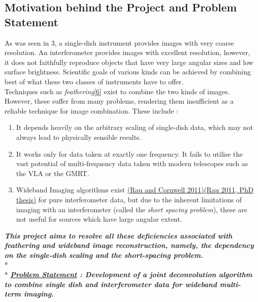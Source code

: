 \documentclass{article}
\begin{document}
\subsection{Motivation behind the Project and Problem Statement}
As was seen in \figurename{ 3}, a single-dish instrument provides images with very coarse resolution. An interferometer provides images with excellent resolution, however, it does not faithfully reproduce objects that have very large angular sizes and low surface brightness. Scientific goals of various kinds can be achieved by combining best of what these two classes of instruments have to offer.\\Techniques such as \textit{feathering}\hyperref[ref6]{[6]} exist to combine the two kinds of images. However, these suffer from many problems, rendering them insufficient as a reliable technique for image combination. These include : 
\begin{enumerate}
\item It depends heavily on the arbitrary scaling of single-dish data, which may not always lead to physically sensible results.
\item It works only for data taken at exactly one frequency. It fails to utilise the vast potential of multi-frequency data taken with modern telescopes such as the VLA or the GMRT. 
\item Wideband Imaging algorithms exist \hyperref[urvpaper]{(Rau and Cornwell 2011)}\hyperref[urvthesis]{(Rau 2011, PhD thesis)} for pure interferometer data, but due to the inherent limitations of imaging with an interferometer (called the \textit{short spacing problem}), these are not useful for sources which have large angular extent. 
\end{enumerate}
\textbf{\textit{This project aims to resolve all these deficiencies associated with feathering and wideband image reconstruction, namely, the dependency on the single-dish scaling and the short-spacing problem.}}\\*\\*
\textbf{\textit{\underline{Problem Statement} : Development of a joint deconvolution algorithm to combine single dish and interferometer data for wideband multi-term imaging.}}
\end{document}
